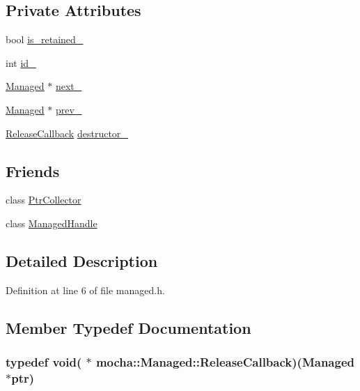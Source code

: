 \subsection*{Private Attributes}
\begin{DoxyCompactItemize}
\item 
bool \hyperlink{classmocha_1_1_managed_ab54c73d26d18b29a750f1059634cb1cc}{is\_\-retained\_\-}
\item 
int \hyperlink{classmocha_1_1_managed_a363b983b4bd61e3beb5766882bab832c}{id\_\-}
\item 
\hyperlink{classmocha_1_1_managed}{Managed} $\ast$ \hyperlink{classmocha_1_1_managed_a732598822f2cec7406df37bcf789f68a}{next\_\-}
\item 
\hyperlink{classmocha_1_1_managed}{Managed} $\ast$ \hyperlink{classmocha_1_1_managed_a113a03086a31cc2a7af2c4c72e001763}{prev\_\-}
\item 
\hyperlink{classmocha_1_1_managed_a6f59062ca3a8734842db97c2ae049c0e}{ReleaseCallback} \hyperlink{classmocha_1_1_managed_a675129a376db51da9f6f1b510ce5c006}{destructor\_\-}
\end{DoxyCompactItemize}
\subsection*{Friends}
\begin{DoxyCompactItemize}
\item 
class \hyperlink{classmocha_1_1_managed_a73d86f43b616a0898e6309038ca76ee8}{PtrCollector}
\item 
class \hyperlink{classmocha_1_1_managed_a102b7b383e0de8f3e612201cac01a458}{ManagedHandle}
\end{DoxyCompactItemize}


\subsection{Detailed Description}


Definition at line 6 of file managed.h.



\subsection{Member Typedef Documentation}
\hypertarget{classmocha_1_1_managed_a6f59062ca3a8734842db97c2ae049c0e}{
\subsubsection[{ReleaseCallback}]{\setlength{\rightskip}{0pt plus 5cm}typedef void( $\ast$ {\bf mocha::Managed::ReleaseCallback})({\bf Managed} $\ast$ptr)}}
\label{classmocha_1_1_managed_a6f59062ca3a8734842db97c2ae049c0e}


